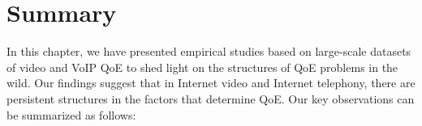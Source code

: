 %








\section{Summary}
\label{sec:measurement:summary}

In this chapter, we have presented 
empirical studies based on large-scale datasets of video and VoIP QoE 
to shed light on the structures of QoE problems in the wild.
Our findings suggest that in Internet video and Internet telephony,
there are persistent structures 
in the factors that determine QoE.
Our key observations can be summarized as follows:

